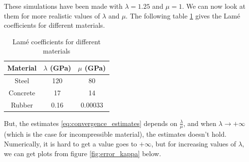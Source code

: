 \documentclass[a4paper,12pt,twoside]{report}
\begin{document}
These simulations have been made with $\lambda = 1.25$ and $\mu = 1$. We can now look at them for more realistic values of $\lambda$ and $\mu$. The following table \ref{tab:lame_coefficients} gives the Lamé coefficients for different materials. 
\begin{table}[h]
\centering
\begin{tabular}{|c|c|c|}
\hline
Material & $\lambda$ (GPa) & $\mu$ (GPa) \\
\hline
Steel & 120 & 80 \\
\hline
Concrete & 17 & 14 \\
\hline
Rubber & 0.16 & 0.00033 \\
\hline
\end{tabular}
\caption{Lamé coefficients for different materials}
\label{tab:lame_coefficients}
\end{table}

But, the estimates \eqref{eq:convergence_estimates} depends on $\frac{\lambda}{\mu}$, and when $\lambda \rightarrow + \infty$ (which is the case for incompressible material), the estimates doesn't hold. Numerically, it is hard to get a value goes to $+\infty$, but for increasing values of $\lambda$, we can get plots from figure \ref{fig:error_kappa} below. 
\end{document}
